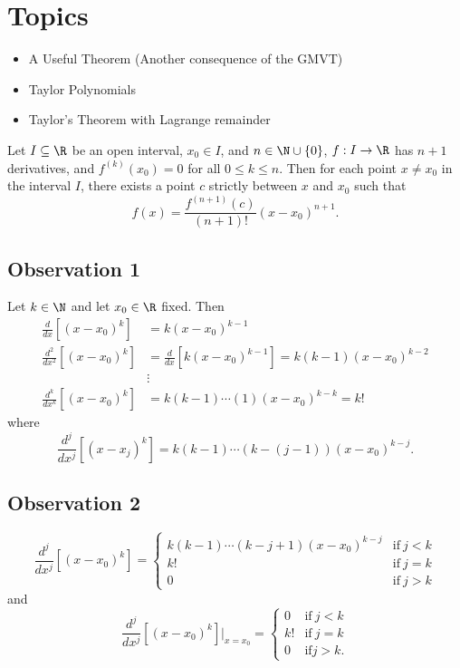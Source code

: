 \section{Topics}

\begin{itemize}
    \item A Useful Theorem (Another consequence of the GMVT)
    \item Taylor Polynomials
    \item Taylor's Theorem with Lagrange remainder
\end{itemize}

\begin{corollary}
    Let \( I \subseteq  \R   \) be an open interval, \( {x}_{0} \in I  \), and \( n \in \N \cup \{ 0 \}  \), \( f: I \to \R  \) has \( n + 1  \) derivatives, and \( f^{(k)}({x}_{0}) = 0  \) for all \( 0 \leq k \leq n  \). Then for each point \( x \neq {x}_{0} \) in the interval \( I  \), there exists a point \( c  \) strictly between \( x  \) and \( {x}_{0} \) such that 
    \[  f(x) = \frac{ f^{(n+1)}(c) }{ (n+1)! } (x-{x}_{0})^{n+1}. \]
\end{corollary}

\subsection{Observation 1}

Let \( k \in \N  \) and let \( {x}_{0} \in \R  \) fixed. Then
\begin{align*}
    \frac{ d }{ dx } [(x - {x}_{0})^{k}] &= k (x - {x}_{0})^{k-1} \\
    \frac{ d^{2} }{ d x^{2} } [(x- {x}_{0})^{k}] &= \frac{ d  }{  d x  }  [ k (x - {x}_{0})^{k-1}] = k (k - 1) (x - {x}_{0})^{k - 2} \\
                                                 &\vdots \\
    \frac{ d^{k }  }{  d x^{k } }  [(x - {x}_{0})^{k}] &= k (k -1)\cdots (1) (x - {x}_{0})^{k - k} = k!
\end{align*}
where 
\[  \frac{ d^{j} }{  d x^{j } }  [(x - {x}_{j})^{k}] = k (k - 1) \cdots ( k - (j -1)) (x - {x}_{0})^{k - j}.   \]

\subsection{Observation 2}
\[ \frac{ d^{j} }{  d x^{j} } [(x - {x}_{0})^{k}] = 
\begin{cases}
    k (k-1) \cdots (k - j + 1) (x - {x}_{0})^{k - j} &\text{if} \ j < k \\
    k! &\text{if} \ j = k \\
    0 &\text{if} \ j > k 
\end{cases} \]
and
\[ \frac{ d^{j} }{  d x^{j} } [(x - {x}_{0})^{k}] \Big|_{ x = {x}_{0}} = 
\begin{cases}
    0 &\text{if} \ j < k \\
    k! &\text{if} \ j = k \\
    0 &\text{if} j > k. 
\end{cases} \]

